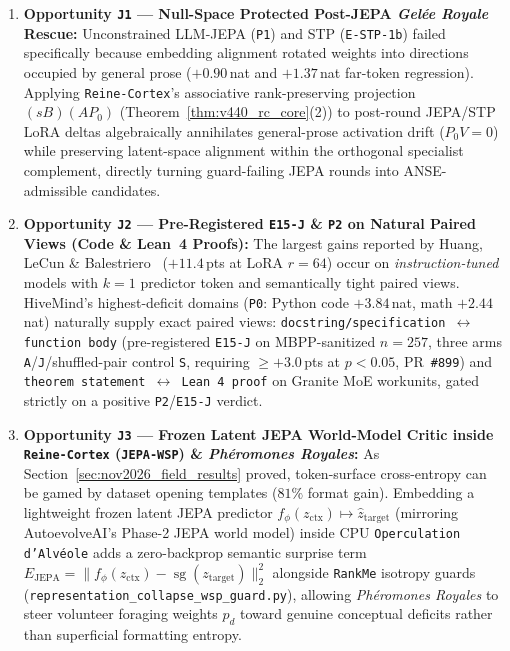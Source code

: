 \documentclass[11pt,a4paper]{article}
\begin{document}
\begin{enumerate}[leftmargin=1.8em]
    \item \textbf{Opportunity \texttt{J1} --- Null-Space Protected Post-JEPA \emph{Gel\'ee Royale} Rescue:} Unconstrained LLM-JEPA (\texttt{P1}) and STP (\texttt{E-STP-1b}) failed specifically because embedding alignment rotated weights into directions occupied by general prose ($+0.90$\,nat and $+1.37$\,nat far-token regression). Applying \texttt{Reine-Cortex}'s associative rank-preserving projection $(sB)(AP_0)$ (Theorem~\ref{thm:v440_rc_core}(2)) to post-round JEPA/STP LoRA deltas algebraically annihilates general-prose activation drift ($P_0 V = 0$) while preserving latent-space alignment within the orthogonal specialist complement, directly turning guard-failing JEPA rounds into ANSE-admissible candidates.
    \item \textbf{Opportunity \texttt{J2} --- Pre-Registered \texttt{E15-J} \& \texttt{P2} on Natural Paired Views (Code \& Lean~4 Proofs):} The largest gains reported by Huang, LeCun \& Balestriero~\cite{huang2025llmjepa} ($+11.4$\,pts at LoRA $r=64$) occur on \emph{instruction-tuned} models with $k=1$ predictor token and semantically tight paired views. HiveMind's highest-deficit domains (\texttt{P0}: Python code $+3.84$\,nat, math $+2.44$\,nat) naturally supply exact paired views: \texttt{docstring/specification $\leftrightarrow$ function body} (pre-registered \texttt{E15-J} on MBPP-sanitized $n=257$, three arms \texttt{A}/\texttt{J}/shuffled-pair control \texttt{S}, requiring $\ge +3.0$\,pts at $p<0.05$, PR~\texttt{\#899}) and \texttt{theorem statement $\leftrightarrow$ Lean~4 proof} on Granite MoE workunits, gated strictly on a positive \texttt{P2}/\texttt{E15-J} verdict.
    \item \textbf{Opportunity \texttt{J3} --- Frozen Latent JEPA World-Model Critic inside \texttt{Reine-Cortex} (\texttt{JEPA-WSP}) \& \emph{Ph\'eromones Royales}:} As Section~\ref{sec:nov2026_field_results} proved, token-surface cross-entropy can be gamed by dataset opening templates ($81\%$ format gain). Embedding a lightweight frozen latent JEPA predictor $f_\phi(z_{\mathrm{ctx}}) \mapsto \hat{z}_{\mathrm{target}}$ (mirroring AutoevolveAI's Phase-2 JEPA world model) inside CPU \texttt{Operculation d'Alv\'eole} adds a zero-backprop semantic surprise term $E_{\mathrm{JEPA}} = \|f_\phi(z_{\mathrm{ctx}}) - \operatorname{sg}(z_{\mathrm{target}})\|_2^2$ alongside \texttt{RankMe} isotropy guards (\texttt{representation\_collapse\_wsp\_guard.py}), allowing \emph{Ph\'eromones Royales} to steer volunteer foraging weights $p_d$ toward genuine conceptual deficits rather than superficial formatting entropy.

\end{enumerate}
\end{document}
